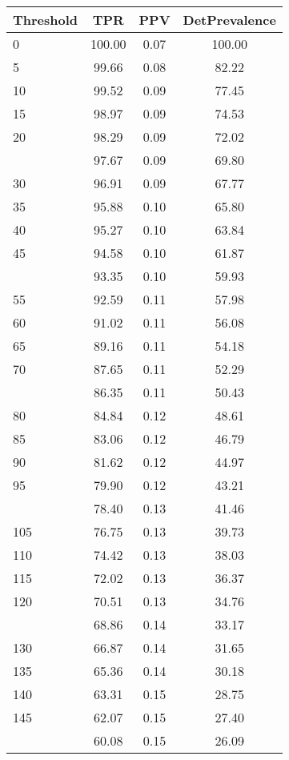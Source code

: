 \begin{table}[ht]
\centering
\begin{tabular}{lccc}
  \toprule
Threshold & TPR & PPV & DetPrevalence \\ 
  \midrule
0 & 100.00 & 0.07 & 100.00 \\ 
  5 & 99.66 & 0.08 & 82.22 \\ 
  10 & 99.52 & 0.09 & 77.45 \\ 
  15 & 98.97 & 0.09 & 74.53 \\ 
  20 & 98.29 & 0.09 & 72.02 \\ 
   \addlinespace
25 & 97.67 & 0.09 & 69.80 \\ 
  30 & 96.91 & 0.09 & 67.77 \\ 
  35 & 95.88 & 0.10 & 65.80 \\ 
  40 & 95.27 & 0.10 & 63.84 \\ 
  45 & 94.58 & 0.10 & 61.87 \\ 
   \addlinespace
50 & 93.35 & 0.10 & 59.93 \\ 
  55 & 92.59 & 0.11 & 57.98 \\ 
  60 & 91.02 & 0.11 & 56.08 \\ 
  65 & 89.16 & 0.11 & 54.18 \\ 
  70 & 87.65 & 0.11 & 52.29 \\ 
   \addlinespace
75 & 86.35 & 0.11 & 50.43 \\ 
  80 & 84.84 & 0.12 & 48.61 \\ 
  85 & 83.06 & 0.12 & 46.79 \\ 
  90 & 81.62 & 0.12 & 44.97 \\ 
  95 & 79.90 & 0.12 & 43.21 \\ 
   \addlinespace
100 & 78.40 & 0.13 & 41.46 \\ 
  105 & 76.75 & 0.13 & 39.73 \\ 
  110 & 74.42 & 0.13 & 38.03 \\ 
  115 & 72.02 & 0.13 & 36.37 \\ 
  120 & 70.51 & 0.13 & 34.76 \\ 
   \addlinespace
125 & 68.86 & 0.14 & 33.17 \\ 
  130 & 66.87 & 0.14 & 31.65 \\ 
  135 & 65.36 & 0.14 & 30.18 \\ 
  140 & 63.31 & 0.15 & 28.75 \\ 
  145 & 62.07 & 0.15 & 27.40 \\ 
   \addlinespace
150 & 60.08 & 0.15 & 26.09 \\ 

\end{tabular}
\end{table}
